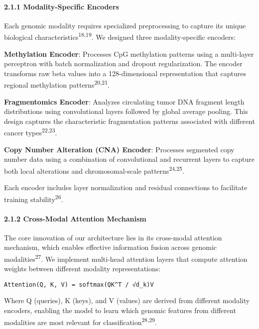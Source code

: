 \paragraph{2.1.1 Modality-Specific
Encoders}\label{modality-specific-encoders}

Each genomic modality requires specialized preprocessing to capture its
unique biological characteristics\textsuperscript{18,19}. We designed
three modality-specific encoders:

\textbf{Methylation Encoder}: Processes CpG methylation patterns using a
multi-layer perceptron with batch normalization and dropout
regularization. The encoder transforms raw beta values into a
128-dimensional representation that captures regional methylation
patterns\textsuperscript{20,21}.

\textbf{Fragmentomics Encoder}: Analyzes circulating tumor DNA fragment
length distributions using convolutional layers followed by global
average pooling. This design captures the characteristic fragmentation
patterns associated with different cancer types\textsuperscript{22,23}.

\textbf{Copy Number Alteration (CNA) Encoder}: Processes segmented copy
number data using a combination of convolutional and recurrent layers to
capture both local alterations and chromosomal-scale
patterns\textsuperscript{24,25}.

Each encoder includes layer normalization and residual connections to
facilitate training stability\textsuperscript{26}.

\paragraph{2.1.2 Cross-Modal Attention
Mechanism}\label{cross-modal-attention-mechanism}

The core innovation of our architecture lies in its cross-modal
attention mechanism, which enables effective information fusion across
genomic modalities\textsuperscript{27}. We implement multi-head
attention layers that compute attention weights between different
modality representations:

\begin{verbatim}
Attention(Q, K, V) = softmax(QK^T / √d_k)V
\end{verbatim}

Where Q (queries), K (keys), and V (values) are derived from different
modality encoders, enabling the model to learn which genomic features
from different modalities are most relevant for
classification\textsuperscript{28,29}.

